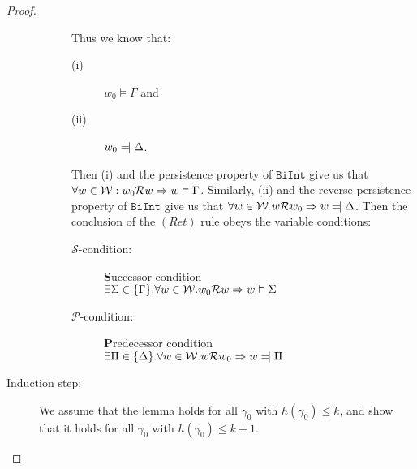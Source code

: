 \documentclass{llncs}
\numberwithin{equation}{section}
\newcommand{\Pred}{{\mathcal{P}}}
\newcommand{\Succ}{{\mathcal{S}}}
\newcommand{\Lg}[1]{\mathtt{#1}}
\newcommand{\Force}{\vDash}
\def\Reject{=\joinrel\mathrel|}
\newcommand{\MetaImp}{\Rightarrow}
\newcommand{\mycal}[1]{
        {\cal{#1}}
}
\newcommand {\BiInt}{
        \Lg{BiInt}
}
\newcommand{\ReturnRule}{(Ret)}
\begin{document}
\begin{proof}
\begin{description}
\begin{description}
			Thus we know that:
			\begin{description}
				\item[\rm{(i)}] $w_0 \Force \Gamma$ and
				\item[\rm{(ii)}] $w_0 \Reject \Delta$.
			\end{description}
			Then (i) and the persistence property of $\BiInt$ give us that $\forall w \in \mycal{W} :w_0 \mycal{R} w \MetaImp w \Force \Gamma$. Similarly, (ii) and the reverse persistence property of $\BiInt$ give us that $\forall w \in \mycal{W} .w \mycal{R} w_0 \MetaImp w \Reject \Delta$. Then the conclusion of the $\ReturnRule$ rule obeys the variable conditions:
			\begin{description}
				\item[$\Succ$-condition:] \textbf{S}uccessor condition \\
					$\exists \Sigma \in \{ \Gamma \} . \forall w \in \mycal{W} .w_0 \mycal{R} w \MetaImp w \Force \Sigma$
				\item[$\Pred$-condition:] \textbf{P}redecessor condition  \\
					$\exists \Pi \in \{ \Delta \} . \forall w \in \mycal{W} . w \mycal{R} w_0 \MetaImp w \Reject \Pi$				
			\end{description}			
		\end{description}
	\item[Induction step:] We assume that the lemma holds for all $\gamma_0$ with $h(\gamma_0) \leq k$, and show that it holds for all $\gamma_0$ with $h(\gamma_0) \leq k+1$. 
	

\end{description}
\end{proof}
\end{document}
